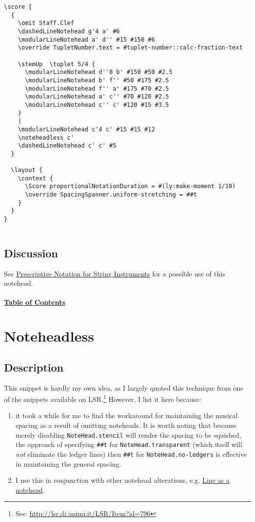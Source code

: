 \begin{verbatim}
\score {
  {
    \omit Staff.Clef
    \dashedLineNotehead g'4 a' #6
    \modularLineNotehead a' d'' #15 #150 #6
    \override TupletNumber.text = #tuplet-number::calc-fraction-text

    \stemUp  \tuplet 5/4 {
      \modularLineNotehead d''8 b' #150 #50 #2.5
      \modularLineNotehead b' f'' #50 #175 #2.5
      \modularLineNotehead f'' a' #175 #70 #2.5
      \modularLineNotehead a' c'' #70 #120 #2.5
      \modularLineNotehead c'' c' #120 #15 #3.5
    }
    |
    \modularLineNotehead c'4 c' #15 #15 #12
    \noteheadless c'
    \dashedLineNotehead c' c' #5
  }

  \layout {
    \context {
      \Score proportionalNotationDuration = #(ly:make-moment 1/10)    
      \override SpacingSpanner.uniform-stretching = ##t
    }
  }
}


\end{verbatim}
\subsection{Discussion}

See \hyperref[sec:comb_strings]{Prescriptive Notation for String Instruments} for a possible use of this notehead. \\
\hyperref[sec:toc]{\\ \textbf{Table of Contents}}

\vfill \break




\section {Noteheadless}
\hfill

\subsection{Description}
This snippet is hardly my own idea, as I largely quoted this technique from one of the snippets available on LSR.\footnote{See: \url{http://lsr.di.unimi.it/LSR/Item?id=796}} However, I list it here because: 
\begin{enumerate} 
\item it took a while for me to find the workaround for maintaining the musical spacing as a result of omitting noteheads. It is worth noting that because merely disabling \verb|NoteHead.stencil| will render the spacing to be squished, the approach of specifying \verb|##t| for \verb|NoteHead.transparent| (which itself will \textit{not} eliminate the ledger lines) then \verb|##t| for \verb|NoteHead.no-ledgers| is effective in maintaining the general spacing.
\item I use this in conjunction with other notehead alterations, e.g. \hyperref[sec:line_notehead]{Line as a notehead}. 
\end{enumerate}

